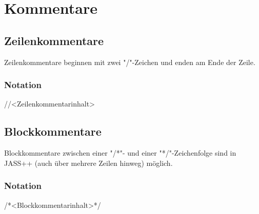 \chapter{Kommentare}

\section{Zeilenkommentare}
Zeilenkommentare beginnen mit zwei "/"-Zeichen und enden am Ende der Zeile.

\subsection{Notation}
//<Zeilenkommentarinhalt>

\section{Blockkommentare}
Blockkommentare zwischen einer "/*"- und einer "*/"-Zeichenfolge sind in JASS++ (auch über mehrere Zeilen hinweg) möglich.

\subsection{Notation}
/*<Blockkommentarinhalt>*/
